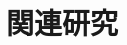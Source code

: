 \documentclass{deimj}
\begin{document}
\section{関連研究}
\label{sec:Related Work}
%
%
%
%
%
\end{document}

